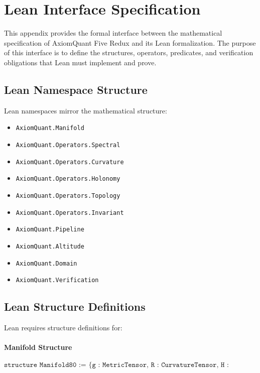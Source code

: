 \section{Lean Interface Specification}
\label{sec:leaninterface}

This appendix provides the formal interface between the mathematical
specification of AxiomQuant Five Redux and its Lean formalization. The purpose
of this interface is to define the structures, operators, predicates, and
verification obligations that Lean must implement and prove.

\subsection{Lean Namespace Structure}

Lean namespaces mirror the mathematical structure:

\begin{itemize}
    \item \texttt{AxiomQuant.Manifold}
    \item \texttt{AxiomQuant.Operators.Spectral}
    \item \texttt{AxiomQuant.Operators.Curvature}
    \item \texttt{AxiomQuant.Operators.Holonomy}
    \item \texttt{AxiomQuant.Operators.Topology}
    \item \texttt{AxiomQuant.Operators.Invariant}
    \item \texttt{AxiomQuant.Pipeline}
    \item \texttt{AxiomQuant.Altitude}
    \item \texttt{AxiomQuant.Domain}
    \item \texttt{AxiomQuant.Verification}
\end{itemize}

\subsection{Lean Structure Definitions}

Lean requires structure definitions for:

\paragraph{Manifold Structure}
\[
\texttt{structure Manifold80 :=
\{ g : MetricTensor,
  R : CurvatureTensor,
  H : HolonomyField,
  tau : TopologySignature \}}
\]

